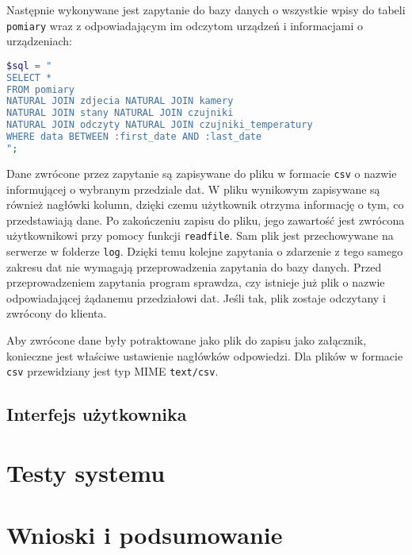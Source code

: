 \documentclass[a4paper,12pt,twoside]{article}
\begin{document}
Następnie wykonywane jest zapytanie do bazy danych o wszystkie wpisy do tabeli \texttt{pomiary} wraz z odpowiadającym im odczytom urządzeń i informacjami o urządzeniach:
\begin{lstlisting}[language=PHP]
$sql = "
SELECT *
FROM pomiary 
NATURAL JOIN zdjecia NATURAL JOIN kamery
NATURAL JOIN stany NATURAL JOIN czujniki
NATURAL JOIN odczyty NATURAL JOIN czujniki_temperatury
WHERE data BETWEEN :first_date AND :last_date
";
\end{lstlisting}
Dane zwrócone przez zapytanie są zapisywane do pliku w formacie \texttt{csv} o nazwie informującej o wybranym przedziale dat. W pliku wynikowym zapisywane są również nagłówki kolumn, dzięki czemu użytkownik otrzyma informację o tym, co przedstawiają dane. Po zakończeniu zapisu do pliku, jego zawartość jest zwrócona użytkownikowi przy pomocy funkcji \texttt{readfile}. Sam plik jest przechowywane na serwerze w folderze \texttt{log}. Dzięki temu kolejne zapytania o zdarzenie z tego samego zakresu dat nie wymagają przeprowadzenia zapytania do bazy danych. Przed przeprowadzeniem zapytania program sprawdza, czy istnieje już plik o nazwie odpowiadającej żądanemu przedziałowi dat. Jeśli tak, plik zostaje odczytany i zwrócony do klienta.

Aby zwrócone dane były potraktowane jako plik do zapisu jako załącznik, konieczne jest właściwe ustawienie nagłówków odpowiedzi. Dla plików w formacie \texttt{csv} przewidziany jest typ MIME \texttt{text/csv}.\cite{mime2}

\subsection{Interfejs użytkownika}

\newpage
\section{Testy systemu}

\newpage
\section{Wnioski i podsumowanie}

\newpage
\end{document}
